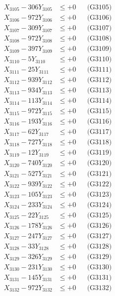 \documentclass[a4paper,10pt]{article}
\begin{document}
{\begin{align}
X_{3105} - 306Y_{3105} &\leq +0 && \text{(G3105)} \\
X_{3106} - 972Y_{3106} &\leq +0 && \text{(G3106)} \\
X_{3107} - 309Y_{3107} &\leq +0 && \text{(G3107)} \\
X_{3108} - 972Y_{3108} &\leq +0 && \text{(G3108)} \\
X_{3109} - 397Y_{3109} &\leq +0 && \text{(G3109)} \\
X_{3110} - 5Y_{3110} &\leq +0 && \text{(G3110)} \\
\allowbreak
X_{3111} - 25Y_{3111} &\leq +0 && \text{(G3111)} \\
X_{3112} - 939Y_{3112} &\leq +0 && \text{(G3112)} \\
X_{3113} - 934Y_{3113} &\leq +0 && \text{(G3113)} \\
X_{3114} - 113Y_{3114} &\leq +0 && \text{(G3114)} \\
X_{3115} - 972Y_{3115} &\leq +0 && \text{(G3115)} \\
X_{3116} - 193Y_{3116} &\leq +0 && \text{(G3116)} \\
X_{3117} - 62Y_{3117} &\leq +0 && \text{(G3117)} \\
X_{3118} - 727Y_{3118} &\leq +0 && \text{(G3118)} \\
X_{3119} - 12Y_{3119} &\leq +0 && \text{(G3119)} \\
X_{3120} - 740Y_{3120} &\leq +0 && \text{(G3120)} \\
\allowbreak
X_{3121} - 527Y_{3121} &\leq +0 && \text{(G3121)} \\
X_{3122} - 939Y_{3122} &\leq +0 && \text{(G3122)} \\
X_{3123} - 105Y_{3123} &\leq +0 && \text{(G3123)} \\
X_{3124} - 233Y_{3124} &\leq +0 && \text{(G3124)} \\
X_{3125} - 22Y_{3125} &\leq +0 && \text{(G3125)} \\
X_{3126} - 178Y_{3126} &\leq +0 && \text{(G3126)} \\
X_{3127} - 247Y_{3127} &\leq +0 && \text{(G3127)} \\
X_{3128} - 33Y_{3128} &\leq +0 && \text{(G3128)} \\
X_{3129} - 326Y_{3129} &\leq +0 && \text{(G3129)} \\
X_{3130} - 231Y_{3130} &\leq +0 && \text{(G3130)} \\
\allowbreak
X_{3131} - 145Y_{3131} &\leq +0 && \text{(G3131)} \\
X_{3132} - 972Y_{3132} &\leq +0 && \text{(G3132)} \\

\end{align}}
\end{document}
